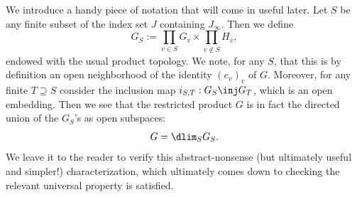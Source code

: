 \documentclass[11pt, x11names, openany]{book}
\begin{document}
We introduce a handy piece of notation that will come in useful later. Let $S$ be any finite subset of the index set $J$ containing $J_\infty$. Then we define
\begin{equation}
\label{eqn: G_S restricted prod}
    G_S := \prod_{v \in S} G_v \times \prod_{v \notin S} H_v,
\end{equation}
endowed with the usual product topology. We note, for any $S$, that this is by definition an open neighborhood of the identity $(e_v)_v$ of $G$. Moreover, for any finite $T \supseteq S$ consider the inclusion map $i_{S, T}: G_S \inj G_T$, which is an open embedding. Then we see that the restricted product $G$ is in fact the directed union of the $G_S$'s as open subspaces:
\begin{equation}
\label{eqn: resprod colim expression}
    G = \dlim_{S} G_S. 
\end{equation}
We leave it to the reader to verify this abstract-nonsense (but ultimately useful and simpler!) characterization, which ultimately comes down to checking the relevant universal property is satisfied.
\end{document}
